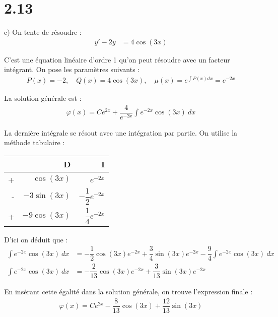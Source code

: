 \section*{2.13}

c) On tente de résoudre :
\begin{align*}
    y' -2y &= 4\cos(3x)
\end{align*}

C'est une équation linéaire d'ordre 1 qu'on peut résoudre avec un facteur
intégrant. On pose les paramètres suivants :
\begin{align*}
    P(x) = -2,\quad Q(x) = 4\cos(3x),\quad \mu(x) = e^{\int{P(x)dx}} =
    e^{-2x}
\end{align*}

La solution générale est :
\begin{align*}
    \varphi(x) = Ce^{2x} + \dfrac{4}{e^{-2x}}\int{e^{-2x}\cos(3x)\ dx}
\end{align*}

La dernière intégrale se résout avec une intégration par partie. On utilise la
méthode tabulaire :
\begin{table}[H]
    \centering
    \begin{tabular}{rrr}
	\toprule[1pt]
	 & D & I \\
	\midrule
	+ & $\cos(3x)$ & $e^{-2x}$\vspace{1mm}\\
	- & $-3\sin(3x)$ & $-\dfrac{1}{2}e^{-2x}$\vspace{2mm}\\
	+ & $-9\cos(3x)$ & $\dfrac{1}{4}e^{-2x}$\vspace{2mm}\\
	\bottomrule[1pt]
    \end{tabular}
\end{table}

D'ici on déduit que :
\begin{align*}
    \int{e^{-2x}\cos(3x)\ dx} &= -\dfrac{1}{2}\cos(3x)e^{-2x} 
    +\dfrac{3}{4}\sin(3x)e^{-2x} -\dfrac{9}{4}\int{e^{-2x}\cos(3x)\ dx} \\
    \int{e^{-2x}\cos(3x)\ dx} &= -\dfrac{2}{13}\cos(3x)e^{-2x} 
    +\dfrac{3}{13}\sin(3x)e^{-2x}
\end{align*}

En insérant cette égalité dans la solution générale, on trouve l'expression
finale :
\begin{align*}
    \varphi(x) = Ce^{2x} - \dfrac{8}{13}\cos(3x) + \dfrac{12}{13}\sin(3x)
\end{align*}
